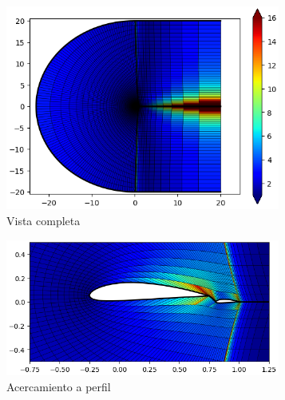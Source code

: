 \documentclass[letterpaper, openright, 12pt]{book}
\begin{document}
    \begin{figure}[htbp!]
        \centering
        \begin{subfigure}[c]{0.48\textwidth}
            \includegraphics[keepaspectratio, width=0.99\textwidth]
                {./img/naca4415_c_flap_aspect_far}
            \caption{Vista completa}
            \label{fig:naca4415_c_flap_aspect_far}
        \end{subfigure}
        \hfill
        \begin{subfigure}[c]{0.48\textwidth}
            \includegraphics[keepaspectratio, width=0.99\textwidth]
                {./img/naca4415_c_flap_aspect_close}
            \caption{Acercamiento a perfil}
            \label{fig:naca4415_c_flap_aspect_close}
        \end{subfigure}
        \begin{subfigure}[c]{0.48\textwidth}

\end{subfigure}
\end{figure}
\end{document}
